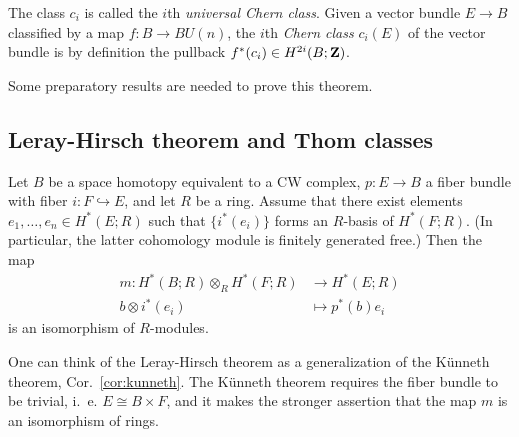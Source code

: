 \documentclass[a4paper,openany]{scrbook}
\begin{document}
The class $c_i$ is called the $i$th \emph{universal Chern class}. Given a vector bundle $E \to B$ classified by a map $f\colon B \to BU(n)$, the $i$th \emph{Chern class} $c_i(E)$ of the vector bundle is by definition the pullback $f^*(c_i) \in H^{2i}(B;\mathbf Z)$.

Some preparatory results are needed to prove this theorem.

\subsection{Leray-Hirsch theorem and Thom classes}

\begin{thm} \label{thm:leray-hirsch}
Let $B$ be a space homotopy equivalent to a CW complex,  $p\colon E \to B$  a fiber bundle with fiber $i\colon F \hookrightarrow E$, and let $R$ be a ring. Assume that there exist elements $e_1,\dots,e_n \in H^*(E;R)$ such that $\{i^*(e_i)\}$ forms an $R$-basis of $H^*(F;R)$. (In particular, the latter cohomology module is finitely generated free.) Then the map
\begin{align*}
m\colon H^*(B;R) \otimes_R H^*(F;R) &\to H^*(E;R)\\
b \otimes i^*(e_i) &\mapsto p^*(b)e_i
\end{align*}
is an isomorphism of $R$-modules. 
\end{thm}

One can think of the Leray-Hirsch theorem as a generalization of the Künneth theorem, Cor.~\ref{cor:kunneth}. The Künneth theorem requires the fiber bundle to be trivial, i.~e. $E \cong B \times F$, and it makes the stronger assertion that the map $m$ is an isomorphism of rings.
\end{document}
